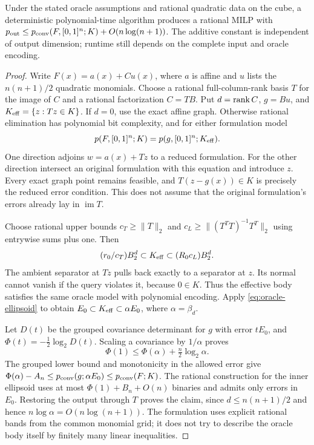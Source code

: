 \begin{theorem}\label{thm:general-quadratic-body}
Under the stated oracle assumptions and rational quadratic data on the
cube, a deterministic polynomial-time algorithm produces a rational MILP
with $p_{\rm out}\le p_{\mathrm{conv}}(F,[0,1]^n;K)+O(n\log(n+1))$. The additive
constant is independent of output dimension; runtime still depends on
the complete input and oracle encoding.
\end{theorem}
\begin{proof}
Write $F(x)=a(x)+Cu(x)$, where $a$ is affine and $u$ lists the
$n(n+1)/2$ quadratic monomials. Choose a rational full-column-rank basis
$T$ for the image of $C$ and a rational factorization $C=TB$. Put
$d=\operatorname{rank} C$, $g=Bu$, and $K_{\rm eff}=\{z:Tz\in K\}$. If $d=0$,
use the exact affine graph. Otherwise rational elimination has polynomial
bit complexity, and for either formulation model
\begin{equation}\label{eq:output-image-equivalence}
 p(F,[0,1]^n;K)=p(g,[0,1]^n;K_{\rm eff}).
\end{equation}
One direction adjoins $w=a(x)+Tz$ to a reduced formulation. For the
other direction intersect an original formulation with this equation and
introduce $z$. Every exact graph point remains feasible, and
$T(z-g(x))\in K$ is precisely the reduced error condition. This does
not assume that the original formulation's errors already lay in
$\operatorname{im}T$.

Choose rational upper bounds $c_T\ge\|T\|_2$ and
$c_L\ge\|(T^TT)^{-1}T^T\|_2$ using entrywise sums plus one. Then
\[
 (r_0/c_T)B_2^d\subset K_{\rm eff}\subset(R_0c_L)B_2^d.
\]
The ambient separator at $Tz$ pulls back exactly to a separator at $z$.
Its normal cannot vanish if the query violates it, because $0\in K$.
Thus the effective body satisfies the same oracle model with polynomial
encoding. Apply \eqref{eq:oracle-ellipsoid} to obtain
$E_0\subset K_{\rm eff}\subset\alpha E_0$, where $\alpha=\beta_d$.

Let $D(t)$ be the grouped covariance determinant for $g$ with error
$tE_0$, and $\Phi(t)=-\frac12\log_2D(t)$. Scaling a covariance by
$1/\alpha$ proves
\begin{equation}\label{eq:body-rounding-loss}
 \Phi(1)\le\Phi(\alpha)+\tfrac n2\log_2\alpha.
\end{equation}
The grouped lower bound and monotonicity in the allowed error give
$\Phi(\alpha)-A_n\le p_{\mathrm{conv}}(g;\alpha E_0)\le p_{\mathrm{conv}}(F;K)$.
The rational construction for the inner ellipsoid uses at most
$\Phi(1)+B_n+O(n)$ binaries and admits only errors in $E_0$.
Restoring the output through $T$ proves the claim, since
$d\le n(n+1)/2$ and hence $n\log\alpha=O(n\log(n+1))$.
The formulation uses explicit rational bands from the common monomial
grid; it does not try to describe the oracle body itself by finitely
many linear inequalities.
\end{proof}

